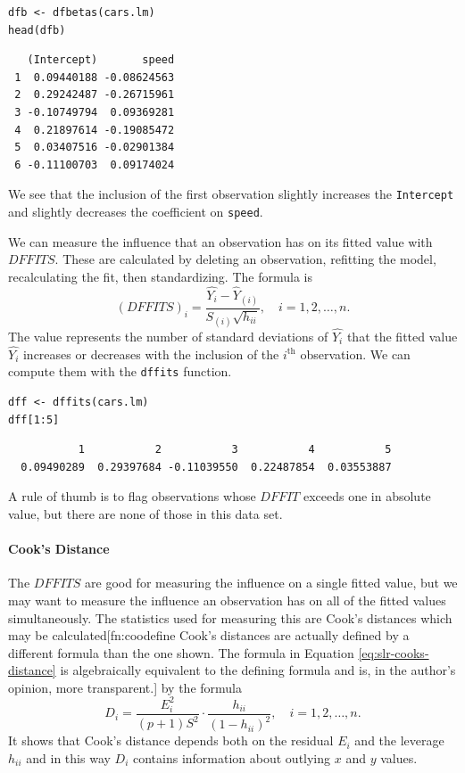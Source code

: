\documentclass[captions=tableheading]{scrbook}
\begin{document}
\begin{verbatim}
dfb <- dfbetas(cars.lm)
head(dfb)
\end{verbatim}

\begin{verbatim}
   (Intercept)       speed
 1  0.09440188 -0.08624563
 2  0.29242487 -0.26715961
 3 -0.10749794  0.09369281
 4  0.21897614 -0.19085472
 5  0.03407516 -0.02901384
 6 -0.11100703  0.09174024
\end{verbatim}

We see that the inclusion of the first observation slightly increases the \texttt{Intercept} and slightly decreases the coefficient on \texttt{speed}.

We can measure the influence that an observation has on its fitted value with \(DFFITS\). These are calculated by deleting an observation, refitting the model, recalculating the fit, then standardizing. The formula is 
\begin{equation}
(DFFITS)_{i}=\frac{\hat{Y_{i}}-\hat{Y}_{(i)}}{S_{(i)}\sqrt{h_{ii}}},\quad i=1,2,\ldots,n.
\end{equation}
The value represents the number of standard deviations of \(\hat{Y_{i}}\) that the fitted value \(\hat{Y_{i}}\) increases or decreases with the inclusion of the \(i^{\textrm{th}}\) observation. We can compute them with the \texttt{dffits} function.


\begin{verbatim}
dff <- dffits(cars.lm)
dff[1:5]
\end{verbatim}

\begin{verbatim}
           1           2           3           4           5 
  0.09490289  0.29397684 -0.11039550  0.22487854  0.03553887
\end{verbatim}

A rule of thumb is to flag observations whose \(DFFIT\) exceeds one in absolute value, but there are none of those in this data set.

\paragraph*{Cook's Distance}

The \(DFFITS\) are good for measuring the influence on a single fitted value, but we may want to measure the influence an observation has on all of the fitted values simultaneously. The statistics used for measuring this are Cook's distances which may be calculated[fn:coodefine Cook's distances are actually defined by a different formula than the one shown. The formula in Equation \ref{eq:slr-cooks-distance} is algebraically equivalent to the defining formula and is, in the author's opinion, more transparent.] by the formula
\begin{equation}
D_{i}=\frac{E_{i}^{2}}{(p+1)S^{2}}\cdot\frac{h_{ii}}{(1-h_{ii})^{2}},\quad i=1,2,\ldots,n.\label{eq:slr-cooks-distance}
\end{equation}
It shows that Cook's distance depends both on the residual \(E_{i}\) and the leverage \(h_{ii}\) and in this way \(D_{i}\) contains information about outlying \(x\) and \(y\) values.
\end{document}
